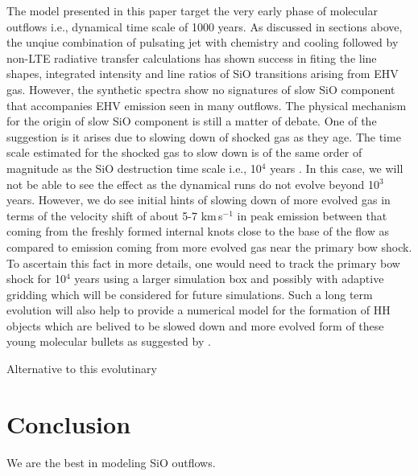 \documentclass[useAMS,usenatbib,letters]{mn2e}
\begin{document}
The model presented in this paper target the very early phase of molecular
outflows i.e., dynamical time scale of 1000 years.
As discussed in sections above, the unqiue combination of pulsating
jet with chemistry and cooling followed by non-LTE radiative transfer
calculations has shown success in fiting the line shapes, integrated intensity and line ratios of SiO
transitions arising from EHV gas. However, the synthetic spectra show
no signatures of slow SiO component that accompanies EHV emission seen
in many outflows. The physical mechanism for the origin of slow SiO component is still a matter
of debate. One of the suggestion is it arises due to slowing down of
shocked gas as they age. The time scale estimated for the shocked gas
to slow down is of the same order of magnitude as the SiO destruction
time scale i.e., 10$^{4}$ years \cite{Codella:1999p12584}. In this
case, we will not be able to see the effect as the dynamical runs do
not evolve beyond 10$^{3}$ years. However, we do see initial 
hints of slowing down of more evolved gas in terms of the velocity
shift of about 5-7 km\,s$^{-1}$ in peak emission between that
coming from the freshly formed internal knots close to the base of the
flow as compared to emission coming from more evolved gas near the
primary bow shock. To ascertain this fact in more details, one would
need to track the primary bow shock for 10$^{4}$ years
using a larger simulation box and possibly with adaptive gridding 
which will be considered for future simulations. Such a long term
evolution will also help to provide a numerical model for the formation of HH objects
which are belived to be slowed down and more evolved form of these
young molecular bullets as suggested by \cite{Norman:1979p14858,
  Hartigan:1987p11178}.
%

Alternative to this evolutinary 




\section{Conclusion}
We are the best in modeling SiO outflows.






\label{lastpage}
\end{document}

